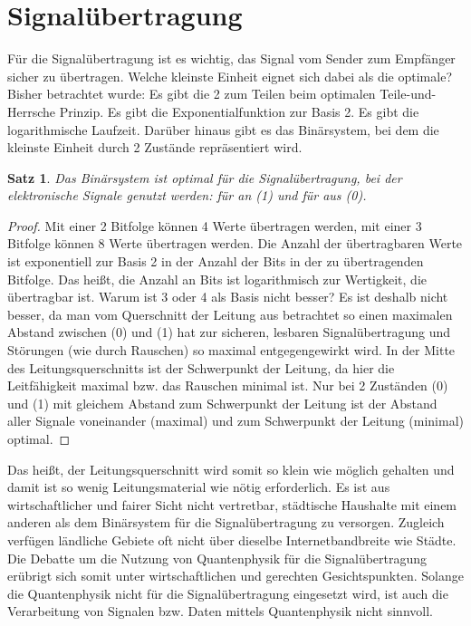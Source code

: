 \documentclass{scrartcl}
\newtheorem{satz}{Satz}[section]
\numberwithin{equation}{section}
\begin{document}
\section{Signalübertragung}
Für die Signalübertragung ist es wichtig, das Signal vom Sender zum Empfänger sicher zu übertragen. Welche kleinste Einheit eignet sich dabei als die optimale? Bisher betrachtet wurde: Es gibt die 2 zum Teilen beim optimalen Teile-und-Herrsche Prinzip. Es gibt die Exponentialfunktion zur Basis 2. Es gibt die logarithmische Laufzeit. Darüber hinaus gibt es das Binärsystem, bei dem die kleinste Einheit durch 2 Zustände repräsentiert wird.
\begin{satz}
	Das Binärsystem ist optimal für die Signalübertragung, bei der elektronische Signale genutzt werden: für an (1) und für aus (0).
\end{satz}
\begin{proof}
	Mit einer 2 Bitfolge können 4 Werte übertragen werden, mit einer 3 Bitfolge können 8 Werte übertragen werden. Die Anzahl der übertragbaren Werte ist exponentiell zur Basis 2 in der Anzahl der Bits in der zu übertragenden Bitfolge. Das heißt, die Anzahl an Bits ist logarithmisch zur Wertigkeit, die übertragbar ist. Warum ist 3 oder 4 als Basis nicht besser? Es ist deshalb nicht besser, da man vom Querschnitt der Leitung aus betrachtet so einen maximalen Abstand zwischen (0) und (1) hat zur sicheren, lesbaren Signalübertragung und Störungen (wie durch Rauschen) so maximal entgegengewirkt wird. In der Mitte des Leitungsquerschnitts ist der Schwerpunkt der Leitung, da hier die Leitfähigkeit maximal bzw. das Rauschen minimal ist. Nur bei 2 Zuständen (0) und (1) mit gleichem Abstand zum Schwerpunkt der Leitung ist der Abstand aller Signale voneinander (maximal) und zum Schwerpunkt der Leitung (minimal) optimal.	
\end{proof}
Das heißt, der Leitungsquerschnitt wird somit so klein wie möglich gehalten und damit ist so wenig Leitungsmaterial wie nötig erforderlich. Es ist aus wirtschaftlicher und fairer Sicht nicht vertretbar, städtische Haushalte mit einem anderen als dem Binärsystem für die Signalübertragung zu versorgen. Zugleich verfügen ländliche Gebiete oft nicht über dieselbe Internetbandbreite wie Städte. Die Debatte um die Nutzung von Quantenphysik für die Signalübertragung erübrigt sich somit unter wirtschaftlichen und gerechten Gesichtspunkten. Solange die Quantenphysik nicht für die Signalübertragung eingesetzt wird, ist auch die Verarbeitung von Signalen bzw. Daten mittels Quantenphysik nicht sinnvoll.
\end{document}
